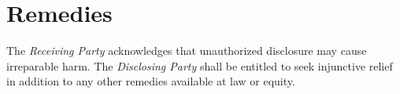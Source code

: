 
\section{Remedies}
\label{sec:remedies}

The \textit{Receiving Party} acknowledges that unauthorized disclosure may cause irreparable harm. The \textit{Disclosing Party} shall be entitled to seek injunctive relief in addition to any other remedies available at law or equity.

